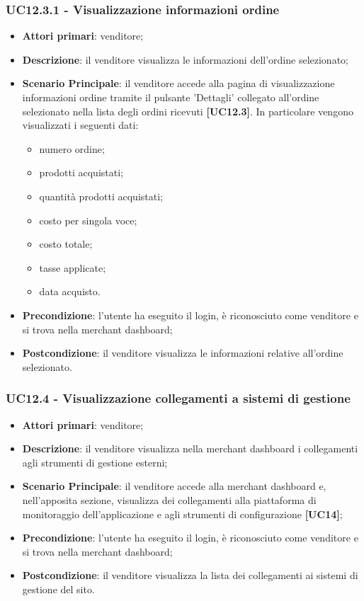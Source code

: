 \subsubsection{UC12.3.1 - Visualizzazione informazioni ordine}
\begin{itemize}
\item \textbf{Attori primari}: venditore;
\item \textbf{Descrizione}: il venditore visualizza le informazioni dell'ordine selezionato;
\item \textbf{Scenario Principale}: il venditore accede alla pagina di visualizzazione informazioni ordine tramite il pulsante 'Dettagli' collegato all'ordine selezionato nella lista degli ordini ricevuti \textbf{[UC12.3]}. In particolare vengono visualizzati i seguenti dati:
\begin{itemize}
	\item numero ordine;
	\item prodotti acquistati;
	\item quantità prodotti acquistati;
	\item costo per singola voce;
	\item costo totale;
	\item tasse applicate;
	\item data acquisto.
\end{itemize}
\item \textbf{Precondizione}: l'utente ha eseguito il login, è riconosciuto come venditore e si trova nella merchant dashboard;
\item \textbf{Postcondizione}: il venditore visualizza le informazioni relative all'ordine selezionato.
\end{itemize}

\subsubsection{UC12.4 - Visualizzazione collegamenti a sistemi di gestione}
\begin{itemize}
\item \textbf{Attori primari}: venditore;
\item \textbf{Descrizione}: il venditore visualizza nella merchant dashboard i collegamenti agli strumenti di gestione esterni;
\item \textbf{Scenario Principale}: il venditore accede alla merchant dashboard e, nell'apposita sezione, visualizza dei collegamenti alla piattaforma di monitoraggio dell'applicazione e agli strumenti di configurazione \textbf{[UC14]};
\item \textbf{Precondizione}: l'utente ha eseguito il login, è riconosciuto come venditore e si trova nella merchant dashboard;
\item \textbf{Postcondizione}: il venditore visualizza la lista dei collegamenti ai sistemi di gestione del sito.
\end{itemize}

